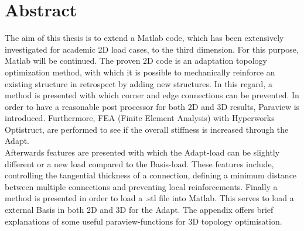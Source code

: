\chapter*{Abstract}

The aim of this thesis is to extend a Matlab code, which has been extensively investigated for academic 2D load cases, to the third dimension. For this purpose, Matlab will be continued. The proven 2D code is an adaptation topology optimization method, with which it is possible to mechanically reinforce an existing structure in retrospect by adding new structures.
In this regard, a method is presented with which corner and edge connections
can be prevented.
In order to have a reasonable post processor for both 2D and 3D results,
 Paraview is introduced.
Furthermore, FEA (Finite Element Analysis)
with Hyperworks Optistruct, are 
performed to see if the overall stiffness is increased through the
Adapt.\\

Afterwards features are presented with 
which the Adapt-load can be slightly different or a new load
compared to the Basis-load.
These features include, controlling the tangential thickness
of a connection, defining a minimum distance between
multiple connections and preventing local reinforcements.
Finally a method is presented in order to 
load a .stl file into Matlab. This serves to 
load a external Basis in both 2D and 3D for the Adapt.
The appendix offers brief explanations of some 
useful paraview-functions for 3D topology optimisation. 

 